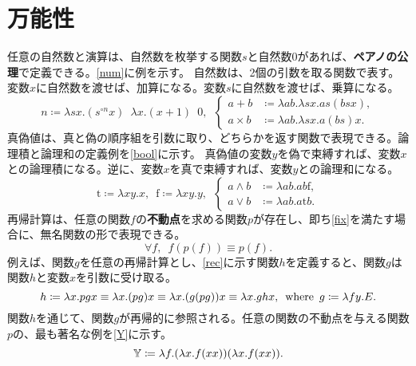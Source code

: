 \documentclass[10pt,a4paper]{book}
\begin{document}
\section{万能性}

任意の自然数と演算は、自然数を枚挙する関数$s$と自然数$0$があれば、\textbf{ペアノの公理}で定義できる。\eqref{num}に例を示す。
自然数は、2個の引数を取る関数で表す。変数$x$に自然数を渡せば、加算になる。変数$s$に自然数を渡せば、乗算になる。
%
\begin{equation}
\label{eq:num}
n \coloneqq \lambda sx.(s^{\circ n}x) \enspace \lambda x.(x+1) \enspace 0,
\enspace
\left\{
\begin{aligned}
a + b &\coloneqq \lambda ab.\lambda sx.as(bsx),\\
a \times b &\coloneqq \lambda ab.\lambda sx.a(bs)x.
\end{aligned}
\right.
\end{equation}
%
真偽値は、真と偽の順序組を引数に取り、どちらかを返す関数で表現できる。論理積と論理和の定義例を\eqref{bool}に示す。
真偽値の変数$y$を偽で束縛すれば、変数$x$との論理積になる。逆に、変数$x$を真で束縛すれば、変数$y$との論理和になる。
%
\begin{equation}
\label{eq:bool}
\mathrm{t} \coloneqq \lambda xy.x, \enspace
\mathrm{f} \coloneqq \lambda xy.y, \enspace
\left\{
\begin{aligned}
a \land b &\coloneqq \lambda ab.ab\mathrm{f},\\
a \lor  b &\coloneqq \lambda ab.a\mathrm{t}b.
\end{aligned}
\right.
\end{equation}
%
再帰計算は、任意の関数$f$の\textbf{不動点}を求める関数$p$が存在し、即ち\eqref{fix}を満たす場合に、無名関数の形で表現できる。
%
\begin{equation}
\label{eq:fix}
\forall f, \enspace f(p(f)) \equiv p(f).
\end{equation}
%
例えば、関数$g$を任意の再帰計算とし、\eqref{rec}に示す関数$h$を定義すると、関数$g$は関数$h$と変数$x$を引数に受け取る。
%
\begin{equation}
\label{eq:rec}
h \coloneqq \lambda x.pgx
\equiv \lambda x.(pg)x
\equiv \lambda x.(g (pg)) x
\equiv \lambda x.ghx
, \enspace\mathrm{where}\enspace g \coloneqq \lambda fy.E.
\end{equation}
%
関数$h$を通じて、関数$g$が再帰的に参照される。任意の関数の不動点を与える関数$p$の、最も著名な例を\eqref{Y}に示す。
%
\begin{equation}
\label{eq:Y}
\mathbb{Y}{} \coloneqq \lambda f.(\lambda x.f(xx))(\lambda x.f(xx)).
\end{equation}
\end{document}
